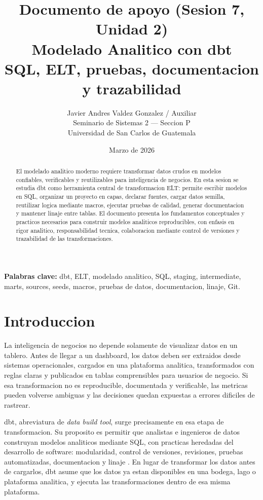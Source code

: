 \documentclass[12pt]{article}
\title{\textbf{Documento de apoyo (Sesion 7, Unidad 2)}\\
\large Modelado Analitico con dbt\\
\normalsize SQL, ELT, pruebas, documentacion y trazabilidad}
\author{Javier Andres Valdez Gonzalez / Auxiliar \\
\small Seminario de Sistemas 2 --- Seccion P \\
\small Universidad de San Carlos de Guatemala}
\date{Marzo de 2026}
\begin{document}
\maketitle

\begin{abstract}
El modelado analitico moderno requiere transformar datos crudos en modelos confiables, verificables y reutilizables para inteligencia de negocios. En esta sesion se estudia dbt como herramienta central de transformacion ELT: permite escribir modelos en SQL, organizar un proyecto en capas, declarar fuentes, cargar datos semilla, reutilizar logica mediante macros, ejecutar pruebas de calidad, generar documentacion y mantener linaje entre tablas. El documento presenta los fundamentos conceptuales y practicos necesarios para construir modelos analiticos reproducibles, con enfasis en rigor analitico, responsabilidad tecnica, colaboracion mediante control de versiones y trazabilidad de las transformaciones.
\end{abstract}

\textbf{Palabras clave:} dbt, ELT, modelado analitico, SQL, staging, intermediate, marts, sources, seeds, macros, pruebas de datos, documentacion, linaje, Git.

\newpage
\tableofcontents

\section{Introduccion}
La inteligencia de negocios no depende solamente de visualizar datos en un tablero. Antes de llegar a un dashboard, los datos deben ser extraidos desde sistemas operacionales, cargados en una plataforma analitica, transformados con reglas claras y publicados en tablas comprensibles para usuarios de negocio. Si esa transformacion no es reproducible, documentada y verificable, las metricas pueden volverse ambiguas y las decisiones quedan expuestas a errores dificiles de rastrear.

dbt, abreviatura de \textit{data build tool}, surge precisamente en esa etapa de transformacion. Su proposito es permitir que analistas e ingenieros de datos construyan modelos analiticos mediante SQL, con practicas heredadas del desarrollo de software: modularidad, control de versiones, revisiones, pruebas automatizadas, documentacion y linaje \cite{dbt_explained}. En lugar de transformar los datos antes de cargarlos, dbt asume que los datos ya estan disponibles en una bodega, lago o plataforma analitica, y ejecuta las transformaciones dentro de esa misma plataforma.
\end{document}
